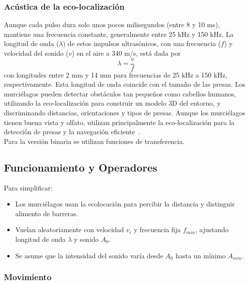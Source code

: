\subsubsection{Acústica de la eco-localización}
Aunque cada pulso dura solo unos pocos milisegundos (entre 8 y 10 ms), mantiene una frecuencia constante, generalmente entre 25 kHz y 150 kHz. La longitud de onda ($\lambda$) de estos impulsos ultrasónicos, con una frecuencia ($f$) y velocidad del sonido ($v$) en el aire a 340 m/s, está dada por
\begin{equation}
    \lambda = \frac{v}{f}
\end{equation}
con longitudes entre 2 mm y 14 mm para frecuencias de 25 kHz a 150 kHz, respectivamente. Esta longitud de onda coincide con el tamaño de las presas. Los murciélagos pueden detectar obstáculos tan pequeños como cabellos humanos, utilizando la eco-localización para construir un modelo 3D del entorno, y discriminando distancias, orientaciones y tipos de presas. Aunque los murciélagos tienen buena vista y olfato, utilizan principalmente la eco-localización para la detección de presas y la navegación eficiente~\cite{yang_new_2010}.\\[6pt]
Para la versión binaria se utilizan funciones de transferencia.
\subsection{Funcionamiento y Operadores}
Para simplificar:
\begin{itemize}
    \item Los murciélagos usan la ecolocación para percibir la distancia y distinguir alimento de barreras.
    \item Vuelan aleatoriamente con velocidad $v_i$ y frecuencia fija $f_{min}$, ajustando longitud de onda $\lambda$ y sonido $A_0$.
    \item Se asume que la intensidad del sonido varía desde $A_0$ hasta un mínimo $A_{min}$.
\end{itemize}
\subsubsection{Movimiento}

